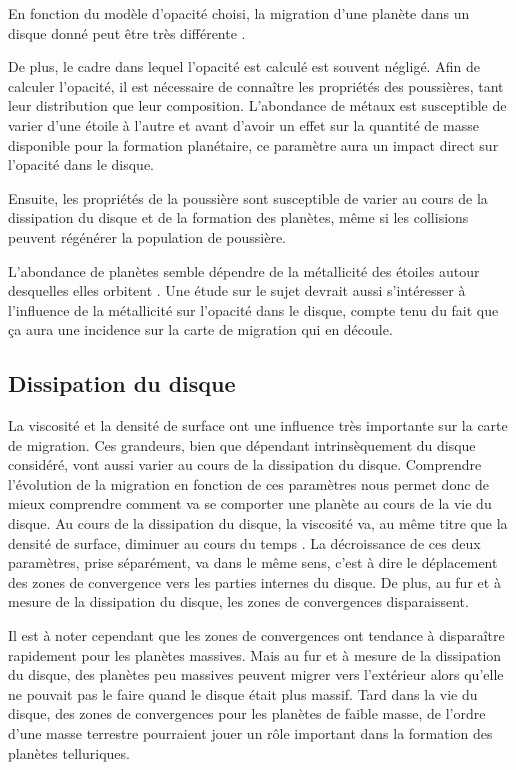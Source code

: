 En fonction du modèle d'opacité choisi, la migration d'une planète dans un disque donné peut être très différente . 

De plus, le cadre dans lequel l'opacité est calculé est souvent négligé. Afin de calculer l'opacité, il est nécessaire de connaître les propriétés des poussières, tant leur distribution que leur composition. L'abondance de métaux est susceptible de varier d'une étoile à l'autre et avant d'avoir un effet sur la quantité de masse disponible pour la formation planétaire, ce paramètre aura un impact direct sur l'opacité dans le disque. 

Ensuite, les propriétés de la poussière sont susceptible de varier au cours de la dissipation du disque et de la formation des planètes, même si les collisions peuvent régénérer la population de poussière.

L'abondance de planètes semble dépendre de la métallicité des étoiles autour desquelles elles orbitent \citep{fischer2005planet}. Une étude sur le sujet devrait aussi s'intéresser à l'influence de la métallicité sur l'opacité dans le disque, compte tenu du fait que ça aura une incidence sur la carte de migration qui en découle.

\subsection{Dissipation du disque}
La viscosité et la densité de surface ont une influence très importante sur la carte de migration. Ces grandeurs, bien que dépendant intrinsèquement du disque considéré, vont aussi varier au cours de la dissipation du disque. Comprendre l'évolution de la migration en fonction de ces paramètres nous permet donc de mieux comprendre comment va se comporter une planète au cours de la vie du disque. Au cours de la dissipation du disque, la viscosité va, au même titre que la densité de surface, diminuer au cours du temps \citep[Fig. 16]{guilloteau2011dual}. La décroissance de ces deux paramètres, prise séparément, va dans le même sens, c'est à dire le déplacement des zones de convergence vers les parties internes du disque. De plus, au fur et à mesure de la dissipation du disque, les zones de convergences disparaissent.

Il est à noter cependant que les zones de convergences ont tendance à disparaître rapidement pour les planètes massives. Mais au fur et à mesure de la dissipation du disque, des planètes peu massives peuvent migrer vers l'extérieur alors qu'elle ne pouvait pas le faire quand le disque était plus massif. Tard dans la vie du disque, des zones de convergences pour les planètes de faible masse, de l'ordre d'une masse terrestre pourraient jouer un rôle important dans la formation des planètes telluriques.

